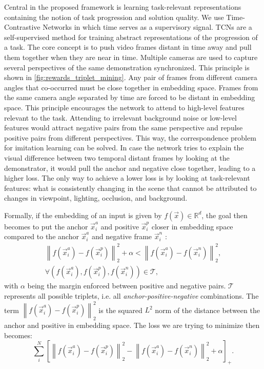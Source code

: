 \documentclass[\home/main.tex]{subfiles}
\begin{document}
Central in the proposed framework is learning task-relevant representations containing the notion of task progression and solution quality. We use Time-Contrastive Networks \autocite{Sermanet2017TCN} in which time serves as a supervisory signal. TCNs are a self-supervised method for training abstract representations of the progression of a task. The core concept is to push video frames distant in time away and pull them together when they are near in time. Multiple cameras are used to capture several perspectives of the same demonstration synchronized. This principle is shown in \cref{fig:rewards_triplet_mining}. Any pair of frames from different camera angles that co-occurred must be close together in embedding space. Frames from the same camera angle separated by time are forced to be distant in embedding space. This principle encourages the network to attend to high-level features relevant to the task.
Attending to irrelevant background noise or low-level features would attract negative pairs from the same perspective and repulse positive pairs from different perspectives. This way, the correspondence problem \autocite{BrassHeyes2005} for imitation learning can be solved. In case the network tries to explain the visual difference between two temporal distant frames by looking at the demonstrator, it would pull the anchor and negative close together, leading to a higher loss. The only way to achieve a lower loss is by looking at task-relevant features: what is consistently changing in the scene that cannot be attributed to changes in viewpoint, lighting, occlusion, and background.

Formally, if the embedding of an input is given by $f(\vec{x}) \in \mathbb{R}^d$, the goal then becomes to put the anchor $\vec{x}_i^a$ and positive $\vec{x}_i^p$ closer in embedding space compared to the anchor $\vec{x}_i^a$ and negative frame $\vec{x}_i^n$ \autocite{FaceNet}:
\begin{align}
    \left\|f\left(\vec{x}_{i}^{a}\right)-f\left(\vec{x}_{i}^{p}\right)\right\|_{2}^{2}+\alpha<\left\|f\left(\vec{x}_{i}^{a}\right)-f\left(\vec{x}_{i}^{n}\right)\right\|_{2}^{2} \nonumber, \\
    \forall\left(f\left(\vec{x}_{i}^{a}\right), f\left(\vec{x}_{i}^{p}\right), f\left(\vec{x}_{i}^{n}\right)\right) \in \mathcal{T},    \nonumber
\end{align}
with $\alpha$ being the margin enforced between positive and negative pairs. $\mathcal{T}$ represents all possible triplets, i.e. all \textit{anchor-positive-negative} combinations. The term $\left\|f\left(\vec{x}_{i}^{a}\right)-f\left(\vec{x}_{i}^{p}\right)\right\|_{2}^{2}$ is the squared $L^2$ norm of the distance between the anchor and positive in embedding space. The loss we are trying to minimize then becomes:
\begin{equation*}
    \sum_{i}^{N}\left[\left\|f\left(\vec{x}_{i}^{a}\right)-f\left(\vec{x}_{i}^{p}\right)\right\|_{2}^{2}-\left\|f\left(\vec{x}_{i}^{a}\right)-f\left(\vec{x}_{i}^{n}\right)\right\|_{2}^{2}+\alpha\right]_{+}.
\end{equation*}
\end{document}
